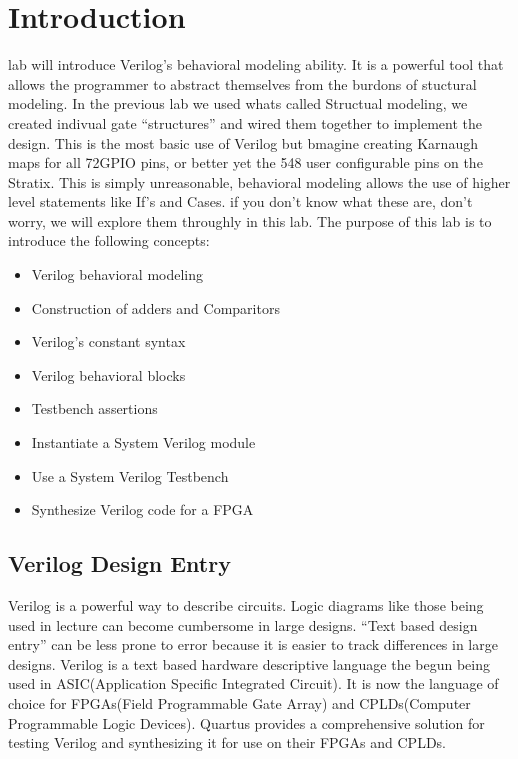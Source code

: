 \documentclass[12pt,journal]{IEEEtran}
\begin{document}




  \section{\bfseries Introduction}
     lab will introduce Verilog's behavioral modeling ability. It is a powerful tool that allows the programmer to abstract themselves from the burdons of stuctural modeling. In the previous lab we used whats called Structual modeling, we created indivual gate ``structures'' and wired them together to implement the design. This is the most basic use of Verilog but bmagine creating Karnaugh maps for all 72GPIO pins, or better yet the 548 user configurable pins on the Stratix\cite{Altera:StratixDeviceOverview}. This is simply unreasonable, behavioral modeling allows the use of higher level statements like If's and Cases. if you don't know what these are, don't worry, we will explore them throughly in this lab. The purpose of this lab is to introduce the following concepts:
    \begin{itemize}
      \item Verilog behavioral modeling
      \item Construction of adders and Comparitors
      \item Verilog's constant syntax
      \item Verilog behavioral blocks
      \item Testbench assertions
      \item Instantiate a System Verilog module
      \item Use a System Verilog Testbench
      \item Synthesize Verilog code for a FPGA
    \end{itemize}
    
    \subsection{Verilog Design Entry}
      Verilog is a powerful way to describe circuits. Logic diagrams like those being used in lecture can become cumbersome in large designs. ``Text based design entry'' can be less prone to error because it is easier to track differences in large designs. Verilog is a text based hardware descriptive language the begun being used in ASIC(Application Specific Integrated Circuit). It is now the language of choice for FPGAs(Field Programmable Gate Array) and CPLDs(Computer Programmable Logic Devices). Quartus provides a comprehensive solution for testing Verilog and synthesizing it for use on their FPGAs and CPLDs.
\end{document}
